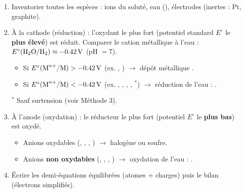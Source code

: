 \documentclass[11pt]{article}
\newcommand{\cle}[1]{{\popxbold\color{popdark}#1}}
\begin{document}
\begin{methode}
\begin{enumerate}
\item \cle{Inventorier} toutes les espèces : ions du soluté, eau (), électrodes (inertes : Pt, graphite).
\item \cle{À la cathode (réduction)} : l'oxydant le plus fort (potentiel standard $E^\circ$ le \textbf{plus élevé}) est réduit.
Comparer le cation métallique à l'eau : $E^\circ(\ce{H2O}/\ce{H2}) \approx \SI{-0,42}{V}$ (pH $= 7$).
\begin{itemize}
\item Si $E^\circ(\ce{M^{n+}/M}) > \SI{-0,42}{V}$ (ex. , ) $\rightarrow$ dépôt métallique .
\item Si $E^\circ(\ce{M^{n+}/M}) < \SI{-0,42}{V}$ (ex. , , , , $^*$) $\rightarrow$ réduction de l'eau : .
\end{itemize}
$^*$ Sauf surtension (voir Méthode 3).
\item \cle{À l'anode (oxydation)} : le réducteur le plus fort (potentiel $E^\circ$ le \textbf{plus bas}) est oxydé.
\begin{itemize}
\item Anions oxydables (, , , ) $\rightarrow$ halogène ou soufre.
\item Anions \textbf{non oxydables} (, , , ) $\rightarrow$ oxydation de l'eau : .
\end{itemize}
\item \cle{Écrire} les demi-équations équilibrées (atomes + charges) puis le bilan (électrons simplifiés).
\end{enumerate}
\end{methode}
\end{document}
